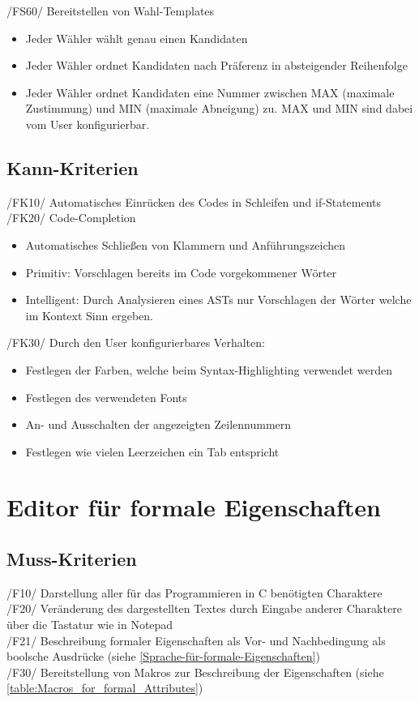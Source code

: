 \documentclass[a4paper]{scrreprt}
\begin{document}
/FS60/ Bereitstellen von Wahl-Templates
\begin{itemize}
\item Jeder Wähler wählt genau einen Kandidaten
\item Jeder Wähler ordnet Kandidaten nach Präferenz in absteigender Reihenfolge 
\item Jeder Wähler ordnet Kandidaten eine Nummer zwischen MAX (maximale Zustimmung) und MIN (maximale Abneigung) zu. MAX und MIN sind dabei vom User konfigurierbar. 
\end{itemize}

\subsection{Kann-Kriterien}
/FK10/ Automatisches Einrücken des Codes in Schleifen und if-Statements \\
/FK20/ Code-Completion
\begin{itemize}
\item Automatisches Schließen von Klammern und Anführungszeichen
\item Primitiv: Vorschlagen bereits im Code vorgekommener Wörter
\item Intelligent: Durch Analysieren eines ASTs nur Vorschlagen der Wörter welche im Kontext Sinn ergeben.
\end{itemize}

/FK30/ Durch den User konfigurierbares Verhalten:
\begin{itemize}
\item Festlegen der Farben, welche beim Syntax-Highlighting verwendet werden
\item Festlegen des verwendeten Fonts
\item An- und Ausschalten der angezeigten Zeilennummern
\item Festlegen wie vielen Leerzeichen ein Tab entspricht
\end{itemize}
 
\section{Editor für formale Eigenschaften}
\subsection{Muss-Kriterien}
/F10/ Darstellung aller für das Programmieren in C benötigten Charaktere \\
/F20/ Veränderung des dargestellten Textes durch Eingabe anderer Charaktere über die  Tastatur wie in Notepad \\
/F21/ Beschreibung formaler Eigenschaften als Vor- und Nachbedingung als boolsche Ausdrücke (siehe \ref{Sprache-für-formale-Eigenschaften})\\
/F30/ Bereitstellung von Makros zur Beschreibung der Eigenschaften (siehe \ref{table:Macros_for_formal_Attributes}) \\
\end{document}

